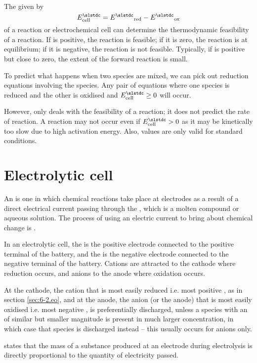 \documentclass[Chemistry.tex]{subfiles}
\begin{document}
The  \slEocell{} given by \begin{equation}\slEocell = \slEo_\text{red} - \slEo_\text{ox}\end{equation} of a reaction or electrochemical cell can determine the thermodynamic feasibility of a reaction. If \slEocell{} is positive, the reaction is feasible; if it is zero, the reaction is at equilibrium; if it is negative, the reaction is not feasible. Typically, if \slEocell{} is positive but close to zero, the extent of the forward reaction is small.

To predict what happens when two species are mixed, we can pick out reduction equations involving the species. Any pair of equations where one species is reduced and the other is oxidised and \(\slEocell \geq 0\) will occur.

However, \slEocell{} only deals with the feasibility of a reaction; it does not predict the rate of reaction. A reaction may not occur even if \(\slEocell > 0\) as it may be kinetically too slow due to high activation energy. Also, \slEocell{} values are only valid for standard conditions.
\section{Electrolytic cell}
An  is one in which chemical reactions take place at electrodes as a result of a direct electrical current passing through the , which is a molten compound or aqueous solution. The process of using an electric current to bring about chemical change is .

In an electrolytic cell, the  is the positive electrode connected to the positive terminal of the battery, and the  is the negative electrode connected to the negative terminal of the battery. Cations are attracted to the cathode where reduction occurs, and anions to the anode where oxidation occurs.

At the cathode, the cation that is most easily reduced i.e. most positive \slEo{}, as in section \ref{sec:6-2.eo}, and at the anode, the anion (or the anode) that is most easily oxidised i.e. most negative \slEo{}, is preferentially discharged, unless a species with an \slEo{} of similar but smaller magnitude is present in much larger concentration, in which case that species is discharged instead -- this usually occurs for anions only.

 states that the mass of a substance produced at an electrode during electrolysis is directly proportional to the quantity of electricity passed.
\end{document}

